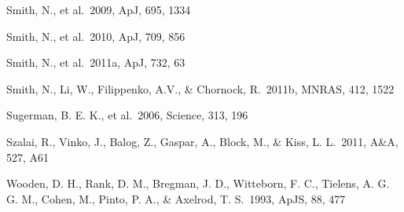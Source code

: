 \documentclass{emulateapj}
\begin{document}
\begin{references}
 Smith, N., et al.\ 2009, ApJ, 695, 1334 %

 Smith, N., et al.\ 2010, ApJ, 709, 856

 Smith, N., et al.\ 2011a, ApJ, 732, 63

 Smith, N., Li, W., Filippenko, A.V., \& Chornock, R.\
2011b, MNRAS, 412, 1522








 Sugerman, B. E. K., et al.\ 2006, Science, 313, 196

 Szalai, R., Vinko, J., Balog, Z., Gaspar, A., Block, M.,
\& Kiss, L. L.\ 2011, A\&A, 527, A61






 Wooden, D. H., Rank, D. M., Bregman, J. D., Witteborn, F. C.,
Tielens, A. G. G. M., Cohen, M., Pinto, P. A., \& Axelrod, T. S.\ 1993,
ApJS, 88, 477


\end{references}
\end{document}
